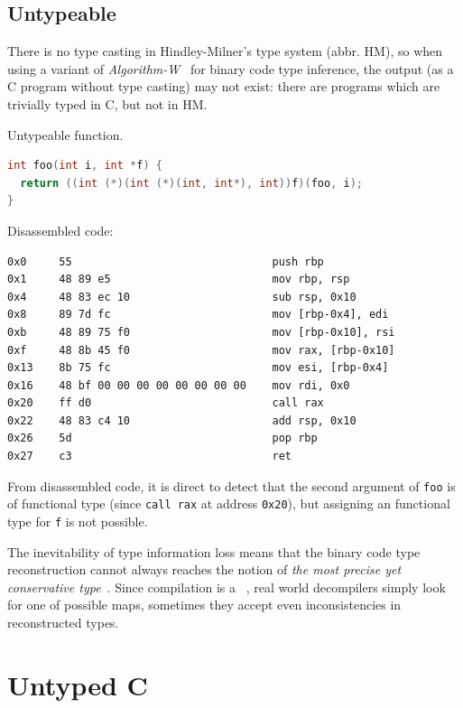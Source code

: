 \documentclass[a4paper]{llncs}
\begin{document}
\subsection{Untypeable}

There is no type casting in Hindley-Milner's type system (abbr. HM), so when using a variant of
\emph{Algorithm-W}~\cite{milner_theory_1978} for binary code type inference, the output (as a
C program without type casting) may not exist: there are programs which are
trivially typed in C, but not in HM.

\begin{example}\label{exa:untypeable}
Untypeable function.
\begin{lstlisting}[frame=topline, language={C}]
int foo(int i, int *f) {
  return ((int (*)(int (*)(int, int*), int))f)(foo, i);
}
\end{lstlisting}
Disassembled code:
\begin{lstlisting}[frame=bottomline, language={[x86masm]Assembler}]
0x0     55                               push rbp
0x1     48 89 e5                         mov rbp, rsp
0x4     48 83 ec 10                      sub rsp, 0x10
0x8     89 7d fc                         mov [rbp-0x4], edi
0xb     48 89 75 f0                      mov [rbp-0x10], rsi
0xf     48 8b 45 f0                      mov rax, [rbp-0x10]
0x13    8b 75 fc                         mov esi, [rbp-0x4]
0x16    48 bf 00 00 00 00 00 00 00 00    mov rdi, 0x0
0x20    ff d0                            call rax
0x22    48 83 c4 10                      add rsp, 0x10
0x26    5d                               pop rbp
0x27    c3                               ret
\end{lstlisting}

From disassembled code, it is direct to detect that the second argument
of \texttt{foo} is of functional type (since \texttt{call rax} at address \texttt{0x20}),
but assigning an functional type for \texttt{f} is not possible.
\end{example}

The inevitability of type information loss means that the binary code
type reconstruction cannot always reaches the notion of
\emph{the most precise yet conservative type}~\cite{lee_tie_2011}. Since
compilation is a ~\cite{mycroft_type-based_1999},
real world decompilers simply look for one of possible maps,
sometimes they accept even inconsistencies in reconstructed types.

\section{Untyped C}
\end{document}
